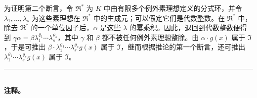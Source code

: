 为证明第二个断言，令 $\mathfrak{R}^*$ 为 $K$ 中由有限多个例外素理想定义的分式环，并令 $\lambda_1,\ldots,\lambda_s$ 为这些素理想在 $\mathfrak{R}^*$ 中的生成元；可以假定它们是代数整数。在 $\mathfrak{R}^*$ 中，除去 $\mathfrak{R}^*$ 的一个单位因子后，$\alpha$ 是这些 $\lambda$ 的幂乘积。因此，退回到代数整数便得到 $\gamma\alpha = \beta \lambda_1^{\varrho_1} \cdots \lambda_s^{\varrho_s}$，其中 $\gamma$ 和 $\beta$ 都不被任何例外素理想整除。由 $\alpha \cdot g(x)$ 属于 $\mathfrak{I}$，于是可推出 $\beta \cdot \lambda_1^{\varrho_1} \cdots \lambda_s^{\varrho_s} g(x)$ 属于 $\mathfrak{I}$，继而根据推论的第一个断言，还可推出 $\lambda_1^{\varrho_1} \cdots \lambda_s^{\varrho_s} g(x)$ 属于 $\mathfrak{I}$。

\begin{center}
\rule{4cm}{0.4pt}\\[0.6em]
\textbf{注释。}
\end{center}

